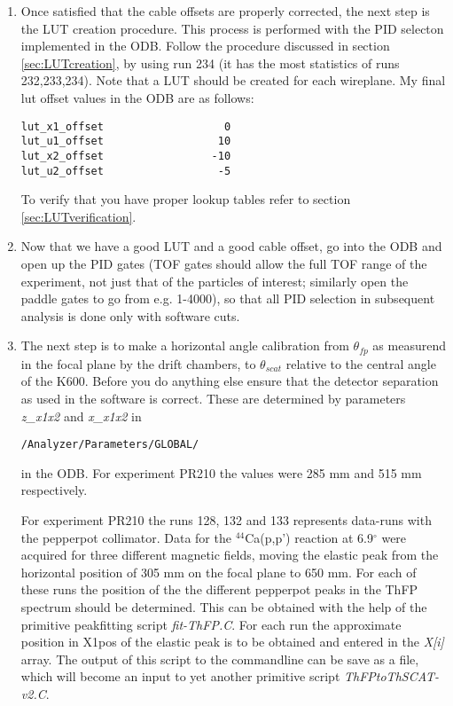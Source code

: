 \documentclass[11pt]{report}
\begin{document}
\begin{enumerate}
\item 
Once satisfied that the cable offsets are properly corrected, the next
step is the LUT creation procedure. This process is performed with the
PID selecton implemented in the ODB. 
Follow the procedure discussed in section \ref{sec:LUTcreation},
by using run 234 (it has the most statistics of runs 232,233,234).
Note that a LUT should be created for each wireplane.
My final lut offset values in the ODB are as follows:
\begin{verbatim}
lut_x1_offset                   0
lut_u1_offset                  10
lut_x2_offset                 -10
lut_u2_offset                  -5
\end{verbatim}
To verify that you have proper lookup tables refer to section \ref{sec:LUTverification}.

\item 
Now that we have a good LUT and a good cable offset, go into the ODB and
open up the PID gates (TOF gates should allow the full TOF range of the experiment, not just that of 
the particles of interest; similarly open the paddle gates to go from e.g. 1-4000), 
so that all PID selection in subsequent analysis is done only with software cuts.

\item The next step is to make a horizontal angle calibration from $\theta_{fp}$
as measurend in the focal plane by the drift chambers, to $\theta_{scat}$ relative to
the central angle of the K600. 
%
Before you do anything else ensure that the detector separation as used in the
software is correct. These are determined by parameters {\it z\_x1x2} and {\it x\_x1x2} in 
\begin{verbatim}
/Analyzer/Parameters/GLOBAL/
\end{verbatim}
in the ODB. For experiment PR210 the values were 285 mm and 515 mm respectively.

For experiment PR210 the runs 128, 132 and 133 represents data-runs with the pepperpot
collimator. Data for the $^{44}$Ca(p,p') reaction at 6.9$^{\circ}$ were acquired for
three different magnetic fields, moving the elastic peak from the horizontal position
of 305 mm on the focal plane to 650 mm.  For each of these runs the position of the
the different pepperpot peaks in the ThFP spectrum should be determined.
This can be obtained with the help of the primitive peakfitting script
{\it fit-ThFP.C}.  For each run the approximate position in {X1pos} of the elastic
peak is to be obtained and entered in the {\it X[i]} array. The output of this
script to the commandline can be save as a file, which will become an input to 
yet another primitive script {\it ThFPtoThSCAT-v2.C}. 


\end{enumerate}
\end{document}
